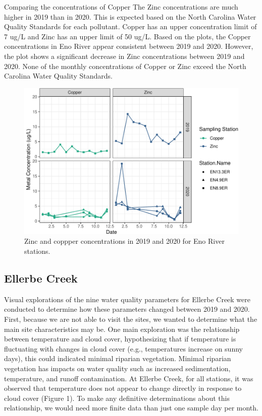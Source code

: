 \documentclass[
  12pt,
]{article}
\begin{document}
Comparing the concentrations of Copper The Zinc concentrations are much
higher in 2019 than in 2020. This is expected based on the North
Carolina Water Quality Standards for each pollutant. Copper has an upper
concentration limit of 7 ug/L and Zinc has an upper limit of 50 ug/L.
Based on the plots, the Copper concentrations in Eno River appear
consistent between 2019 and 2020. However, the plot shows a significant
decrease in Zinc concentrations between 2019 and 2020. None of the
monthly concentrations of Copper or Zinc exceed the North Carolina Water
Quality Standards.

\begin{figure}
\centering
\includegraphics{August_Lindborg_ENV872_Project_files/figure-latex/unnamed-chunk-12-1.pdf}
\caption{Zinc and coppper concentrations in 2019 and 2020 for Eno River
stations.}
\end{figure}

\hypertarget{ellerbe-creek}{%
\subsection{Ellerbe Creek}\label{ellerbe-creek}}

Visual explorations of the nine water quality parameters for Ellerbe
Creek were conducted to determine how these parameters changed between
2019 and 2020. First, because we are not able to visit the sites, we
wanted to determine what the main site characteristics may be. One main
exploration was the relationship between temperature and cloud cover,
hypothesizing that if temperature is fluctuating with changes in cloud
cover (e.g., temperatures increase on sunny days), this could indicated
minimal riparian vegetation. Minimal riparian vegetation has impacts on
water quality such as increased sedimentation, temperature, and runoff
contamination. At Ellerbe Creek, for all stations, it was observed that
temperature does not appear to change directly in response to cloud
cover (Figure 1). To make any definitive determinations about this
relationship, we would need more finite data than just one sample day
per month.
\end{document}

